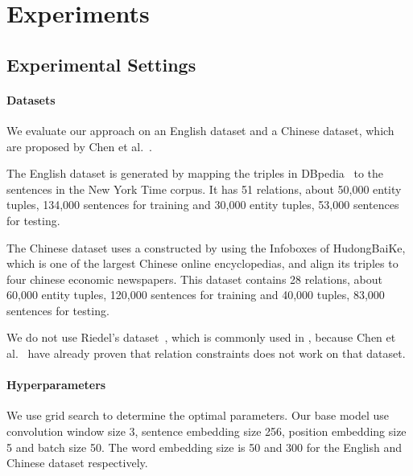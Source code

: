 \section{Experiments}

\subsection{Experimental Settings}
\paragraph{Datasets}
We evaluate our approach on an English dataset and a Chinese dataset, which are proposed by Chen et al.~.


The English dataset is generated by mapping the triples in DBpedia~\cite{bizer2009dbpedia} to the sentences in the New York Time corpus. It has 51 relations, about 50,000 entity tuples, 134,000 sentences for training and 30,000 entity tuples, 53,000 sentences for testing.

The Chinese dataset uses a \KB constructed by using the Infoboxes of HudongBaiKe, which is one of the largest Chinese online encyclopedias, and align its triples to  four chinese economic newspapers.
This dataset contains 28 relations, about 60,000 entity tuples, 120,000 sentences for training and 40,000 tuples, 83,000 sentences for testing.

We do not use Riedel's dataset~\cite{riedel2010modeling}, which is commonly used in \RE, because  Chen et al.~ have already proven that relation constraints does not work on that dataset.

\paragraph{Hyperparameters}
We use grid search to determine the optimal parameters.
Our base model use convolution window size 3, sentence embedding size 256, position embedding size 5 and batch size 50.
The word embedding size is 50 and 300 for the English and Chinese dataset respectively.

